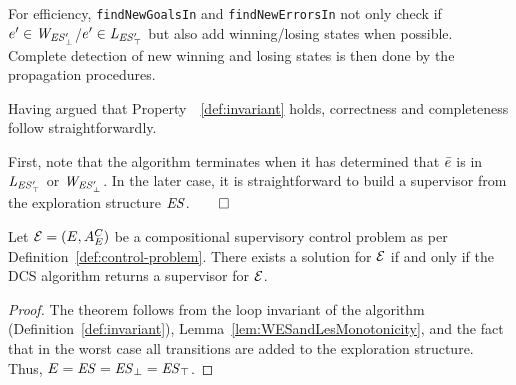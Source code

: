 For efficiency,  \texttt{findNewGoalsIn} and 
\texttt{findNewErrorsIn} not only check if $e' \in \mathit{W_{\mathit{\mathit{ES}'_{\bot}}}}$/$e' \in 
\mathit{L_{\mathit{\mathit{ES}'_{\top}}}}$ but also add  winning/losing states when 
possible. Complete detection of new winning and losing states is 
then done by the propagation procedures. 

Having argued that Property~~\ref{def:invariant} holds, correctness 
and completeness follow straightforwardly. 

First, note that the algorithm terminates when it has determined 
that $\bar{e}$ is in $\mathit{L_{\mathit{\mathit{ES}'_{\top}}}}$ or $\mathit{W_{\mathit{\mathit{ES}'_{\bot}}}}$. In the later case, it is 
straightforward to build a supervisor from the exploration structure 
$\mathit{ES}$.\hfill$\qed$

\begin{theorem}
Let $\mathcal{E} = (E,A_E^C)$ be a compositional supervisory control problem as per Definition~\ref{def:control-problem}. There exists a solution for $\mathcal{E}$ if and only if the DCS algorithm returns a supervisor for $\mathcal{E}$.
\end{theorem}

\begin{proof}
The theorem follows from the loop invariant of the algorithm 
(Definition~\ref{def:invariant}),  
Lemma~\ref{lem:WESandLesMonotonicity}, and 
the fact that in the worst case all transitions are added to the 
exploration structure. Thus,  $E = \mathit{ES} = 
\mathit{\mathit{ES}_{\bot}} = \mathit{\mathit{ES}_{\top}}$.
\end{proof}